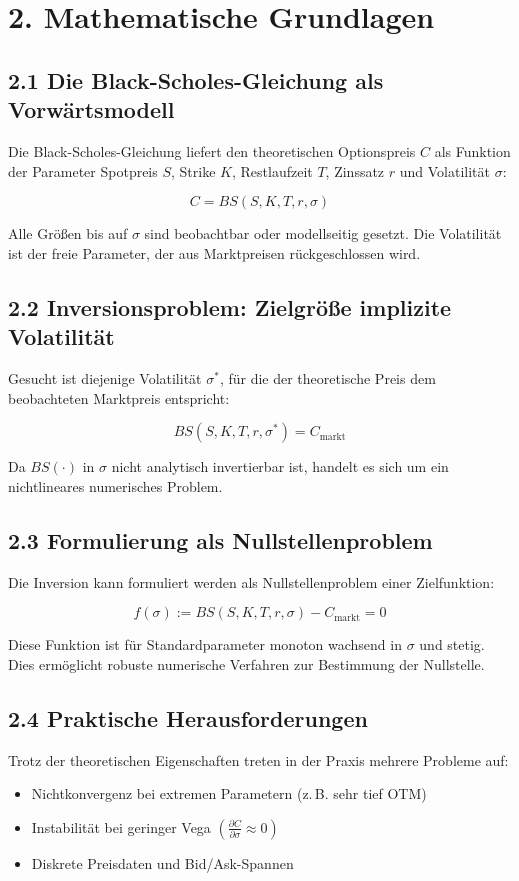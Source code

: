 \documentclass[a4paper,12pt]{article}
\begin{document}
\clearpage
\section*{2. Mathematische Grundlagen}

\subsection*{2.1 Die Black-Scholes-Gleichung als Vorwärtsmodell}
Die Black-Scholes-Gleichung liefert den theoretischen Optionspreis $C$ als Funktion der Parameter Spotpreis $S$, Strike $K$, Restlaufzeit $T$, Zinssatz $r$ und Volatilität $\sigma$:

\[
C = BS(S, K, T, r, \sigma)
\]

Alle Größen bis auf $\sigma$ sind beobachtbar oder modellseitig gesetzt. Die Volatilität ist der freie Parameter, der aus Marktpreisen rückgeschlossen wird.

\subsection*{2.2 Inversionsproblem: Zielgröße implizite Volatilität}
Gesucht ist diejenige Volatilität $\sigma^*$, für die der theoretische Preis dem beobachteten Marktpreis entspricht:

\[
BS(S, K, T, r, \sigma^*) = C_{\text{markt}}
\]

Da $BS(\cdot)$ in $\sigma$ nicht analytisch invertierbar ist, handelt es sich um ein nichtlineares numerisches Problem.

\subsection*{2.3 Formulierung als Nullstellenproblem}
Die Inversion kann formuliert werden als Nullstellenproblem einer Zielfunktion:

\[
f(\sigma) := BS(S, K, T, r, \sigma) - C_{\text{markt}} = 0
\]

Diese Funktion ist für Standardparameter monoton wachsend in $\sigma$ und stetig. Dies ermöglicht robuste numerische Verfahren zur Bestimmung der Nullstelle.


\subsection*{2.4 Praktische Herausforderungen}
Trotz der theoretischen Eigenschaften treten in der Praxis mehrere Probleme auf:

\begin{itemize}
  \item Nichtkonvergenz bei extremen Parametern (z.\,B. sehr tief OTM)
  \item Instabilität bei geringer Vega $\left( \frac{\partial C}{\partial \sigma} \approx 0 \right)$
  \item Diskrete Preisdaten und Bid/Ask-Spannen
\end{itemize}
\end{document}
